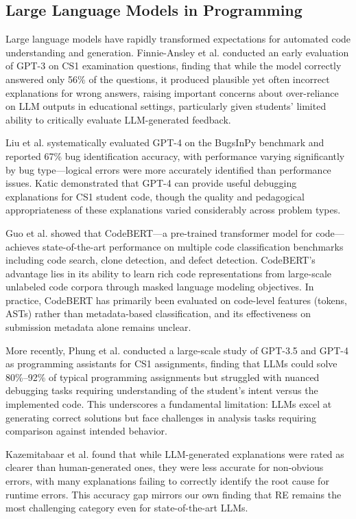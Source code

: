 \documentclass[10pt,a4paper]{article}
\begin{document}
\subsection{Large Language Models in Programming}

Large language models have rapidly transformed expectations for automated code
understanding and generation. Finnie-Ansley et al. \cite{finnie2022robots}
conducted an early evaluation of GPT-3 on CS1 examination questions, finding
that while the model correctly answered only 56\% of the questions, it
produced plausible yet often incorrect explanations for wrong answers,
raising important concerns about over-reliance on LLM outputs in educational
settings, particularly given students' limited ability to critically evaluate
LLM-generated feedback.

Liu et al. \cite{huang2025template} systematically evaluated GPT-4 on the
BugsInPy benchmark and reported 67\% bug identification accuracy, with
performance varying significantly by bug type---logical errors were more
accurately identified than performance issues. Katic \cite{raihan2025large}
demonstrated that GPT-4 can provide useful debugging explanations for CS1
student code, though the quality and pedagogical appropriateness of these
explanations varied considerably across problem types.

Guo et al. \cite{feng2020codebert} showed that CodeBERT---a pre-trained
transformer model for code---achieves state-of-the-art performance on multiple
code classification benchmarks including code search, clone detection, and
defect detection. CodeBERT's advantage lies in its ability to learn rich code
representations from large-scale unlabeled code corpora through masked
language modeling objectives. In practice, CodeBERT has primarily been evaluated
on code-level features (tokens, ASTs) rather than metadata-based
classification, and its effectiveness on submission metadata alone remains
unclear.

More recently, Phung et al. \cite{zamfirescu2023what} conducted a large-scale
study of GPT-3.5 and GPT-4 as programming assistants for CS1 assignments,
finding that LLMs could solve 80\%--92\% of typical programming assignments
but struggled with nuanced debugging tasks requiring understanding of the
student's intent versus the implemented code. This underscores a fundamental
limitation: LLMs excel at generating correct solutions but face challenges in
analysis tasks requiring comparison against intended behavior.

Kazemitabaar et al. \cite{kazemitabaar2024impact} found that while LLM-generated
explanations were rated as clearer than human-generated ones, they were
less accurate for non-obvious errors, with many explanations failing to
correctly identify the root cause for runtime errors. This accuracy gap
mirrors our own finding that RE remains the most challenging category even for
state-of-the-art LLMs.
\end{document}
